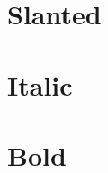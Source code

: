 \section{Slanted}
\textsl{\lipsum[1]}

\section{Italic}
\textit{\lipsum[2]}

\section{Bold}
\textbf{\lipsum[4]}
